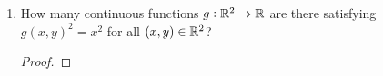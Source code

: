 \documentclass[12pt]{article}
\begin{document}
\begin{enumerate}[label=(\roman*)]




  \begin{claim*}
    There are precisely two continuous functions $f:H \to \R$ satisfying $f(x, y)^2 = x^2$ for all
    $(x, y) \in H$.
  \end{claim*}

  \begin{proof}
    \todo{}
  \end{proof}

\item
  \begin{problem*}
    How many continuous functions $g:\mathbb{R}^2 \to \mathbb{R}$ are there satisfying $g(x, y)^2 = x^2$ for all
    $(x, y) \in \mathbb{R}^2$?
  \end{problem*}
  \begin{proof}
    \todo{}
  \end{proof}
\end{enumerate}

\subsection{}
\end{document}
